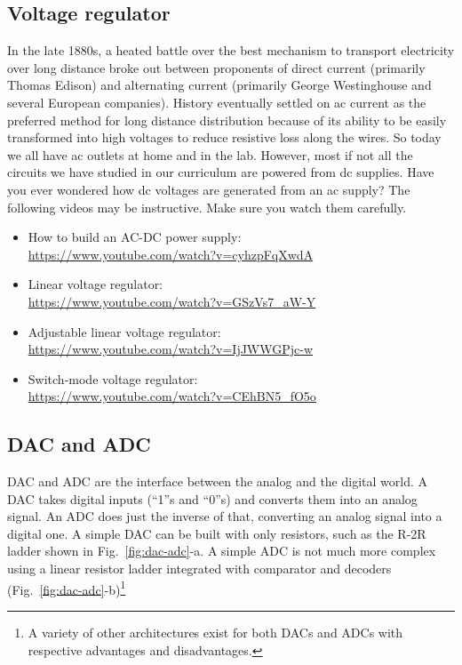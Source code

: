 \documentclass[letterpaper, 11pt]{article}
\begin{document}
\subsection{Voltage regulator}
In the late 1880s, a heated battle over the best mechanism to transport electricity over long distance broke out between proponents of direct current (primarily Thomas Edison) and alternating current (primarily George Westinghouse and several European companies). History eventually settled on ac current as the preferred method for long distance distribution because of its ability to be easily transformed into high voltages to reduce resistive loss along the wires. So today we all have ac outlets at home and in the lab. However, most if not all the circuits we have studied in our curriculum are powered from dc supplies. Have you ever wondered how dc voltages are generated from an ac supply? The following videos may be instructive. Make sure you watch them carefully. 

\begin{itemize}[itemsep=0.1ex]
	\item How to build an AC-DC power supply:\\ \url{https://www.youtube.com/watch?v=cyhzpFqXwdA} 
	\item Linear voltage regulator:\\ \url{https://www.youtube.com/watch?v=GSzVs7_aW-Y}
	\item Adjustable linear voltage regulator:\\  \url{https://www.youtube.com/watch?v=IjJWWGPjc-w}
	\item Switch-mode voltage regulator:\\ \url{https://www.youtube.com/watch?v=CEhBN5_fO5o}
\end{itemize}

\subsection{DAC and ADC}

DAC and ADC are the interface between the analog and the digital world. A DAC takes digital inputs (``1''s and ``0''s) and converts them into an analog signal. An ADC does just the inverse of that, converting an analog signal into a digital one. A simple DAC can be built with only resistors, such as the R-2R ladder shown in Fig.~\ref{fig:dac-adc}-a. A simple ADC is not much more complex using a linear resistor ladder integrated with comparator and decoders (Fig.~\ref{fig:dac-adc}-b)\footnote{A variety of other architectures exist for both DACs and ADCs with respective advantages and disadvantages.}
\end{document}
